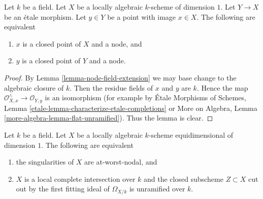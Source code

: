 \begin{lemma}
\label{lemma-node-etale-local}
Let $k$ be a field. Let $X$ be a locally algebraic
$k$-scheme of dimension $1$. Let $Y \to X$ be an \'etale morphism.
Let $y \in Y$ be a point with image $x \in X$. The following are equivalent
\begin{enumerate}
\item $x$ is a closed point of $X$ and a node, and
\item $y$ is a closed point of $Y$ and a node.
\end{enumerate}
\end{lemma}

\begin{proof}
By Lemma \ref{lemma-node-field-extension}
we may base change to the algebraic closure of $k$.
Then the residue fields of $x$ and $y$ are $k$.
Hence the map $\mathcal{O}_{X, x}^\wedge \to \mathcal{O}_{Y, y}$
is an isomorphism (for example by
\'Etale Morphisms of Schemes, Lemma
\ref{etale-lemma-characterize-etale-completions} or
More on Algebra, Lemma \ref{more-algebra-lemma-flat-unramified}).
Thus the lemma is clear.
\end{proof}

\begin{lemma}
\label{lemma-nodal-lci}
Let $k$ be a field. Let $X$ be a locally algebraic $k$-scheme
equidimensional of dimension $1$.
The following are equivalent
\begin{enumerate}
\item the singularities of $X$ are at-worst-nodal, and
\item $X$ is a local complete intersection over $k$
and the closed subscheme $Z \subset X$ cut out by the
first fitting ideal of $\Omega_{X/k}$ is unramified over $k$.
\end{enumerate}
\end{lemma}

